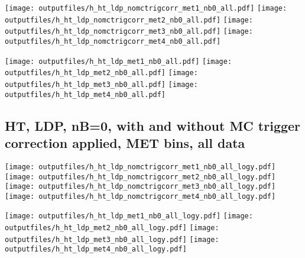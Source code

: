 \documentclass[11pt]{article}
\begin{document}
    \noindent
     \texttt{[image: outputfiles/h\_ht\_ldp\_nomctrigcorr\_met1\_nb0\_all.pdf]}
     \texttt{[image: outputfiles/h\_ht\_ldp\_nomctrigcorr\_met2\_nb0\_all.pdf]}
     \texttt{[image: outputfiles/h\_ht\_ldp\_nomctrigcorr\_met3\_nb0\_all.pdf]}
     \texttt{[image: outputfiles/h\_ht\_ldp\_nomctrigcorr\_met4\_nb0\_all.pdf]}

    \noindent
     \texttt{[image: outputfiles/h\_ht\_ldp\_met1\_nb0\_all.pdf]}
     \texttt{[image: outputfiles/h\_ht\_ldp\_met2\_nb0\_all.pdf]}
     \texttt{[image: outputfiles/h\_ht\_ldp\_met3\_nb0\_all.pdf]}
     \texttt{[image: outputfiles/h\_ht\_ldp\_met4\_nb0\_all.pdf]}

   \clearpage
     \subsection{ HT, LDP, nB=0, with and without MC trigger correction applied, MET bins, all data}

    \noindent
     \texttt{[image: outputfiles/h\_ht\_ldp\_nomctrigcorr\_met1\_nb0\_all\_logy.pdf]}
     \texttt{[image: outputfiles/h\_ht\_ldp\_nomctrigcorr\_met2\_nb0\_all\_logy.pdf]}
     \texttt{[image: outputfiles/h\_ht\_ldp\_nomctrigcorr\_met3\_nb0\_all\_logy.pdf]}
     \texttt{[image: outputfiles/h\_ht\_ldp\_nomctrigcorr\_met4\_nb0\_all\_logy.pdf]}

    \noindent
     \texttt{[image: outputfiles/h\_ht\_ldp\_met1\_nb0\_all\_logy.pdf]}
     \texttt{[image: outputfiles/h\_ht\_ldp\_met2\_nb0\_all\_logy.pdf]}
     \texttt{[image: outputfiles/h\_ht\_ldp\_met3\_nb0\_all\_logy.pdf]}
     \texttt{[image: outputfiles/h\_ht\_ldp\_met4\_nb0\_all\_logy.pdf]}

   \clearpage

\end{document}

